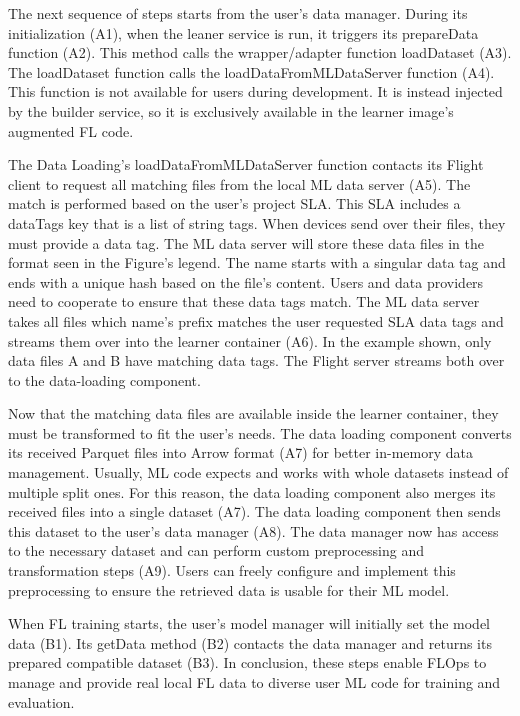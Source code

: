The next sequence of steps starts from the user's data manager.
During its initialization (A1), when the leaner service is run, it triggers its prepareData function (A2).
This method calls the wrapper/adapter function loadDataset (A3).
The loadDataset function calls the loadDataFromMLDataServer function (A4).
This function is not available for users during development.
It is instead injected by the builder service, so it is exclusively available in the learner image's augmented FL code.

The Data Loading's loadDataFromMLDataServer function contacts its Flight client to request all matching files from the local ML data server (A5).
The match is performed based on the user's project SLA.
This SLA includes a dataTags key that is a list of string tags.
When devices send over their files, they must provide a data tag.
The ML data server will store these data files in the format seen in the Figure's legend.
The name starts with a singular data tag and ends with a unique hash based on the file's content.
Users and data providers need to cooperate to ensure that these data tags match.
The ML data server takes all files which name's prefix matches the user requested SLA data tags and streams them over into the learner container (A6).
In the example shown, only data files A and B have matching data tags.
The Flight server streams both over to the data-loading component.

Now that the matching data files are available inside the learner container, they must be transformed to fit the user's needs.
The data loading component converts its received Parquet files into Arrow format (A7) for better in-memory data management.
Usually, ML code expects and works with whole datasets instead of multiple split ones.
For this reason, the data loading component also merges its received files into a single dataset (A7).
The data loading component then sends this dataset to the user's data manager (A8).
The data manager now has access to the necessary dataset and can perform custom preprocessing and transformation steps (A9).
Users can freely configure and implement this preprocessing to ensure the retrieved data is usable for their ML model.

When FL training starts, the user's model manager will initially set the model data (B1).
Its getData method (B2) contacts the data manager and returns its prepared compatible dataset (B3).
In conclusion, these steps enable FLOps to manage and provide real local FL data to diverse user ML code for training and evaluation.